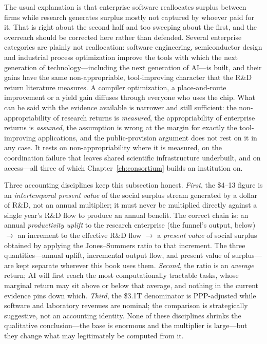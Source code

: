 The usual explanation is that enterprise software reallocates surplus between firms while research generates surplus mostly not captured by whoever paid for it. That is right about the second half and too sweeping about the first, and the overreach should be corrected here rather than defended. Several enterprise categories are plainly not reallocation: software engineering, semiconductor design and industrial process optimization improve the tools with which the next generation of technology---including the next generation of AI---is built, and their gains have the same non-appropriable, tool-improving character that the R\&D return literature measures. A compiler optimization, a place-and-route improvement or a yield gain diffuses through everyone who uses the chip. What can be said with the evidence available is narrower and still sufficient: the non-appropriability of research returns is \emph{measured}, the appropriability of enterprise returns is \emph{assumed}, the assumption is wrong at the margin for exactly the tool-improving applications, and the public-provision argument does not rest on it in any case. It rests on non-appropriability where it is measured, on the coordination failure that leaves shared scientific infrastructure underbuilt, and on access---all three of which Chapter~\ref{ch:consortium} builds an institution on.

Three accounting disciplines keep this subsection honest. \emph{First}, the \$4--13 figure is an \emph{intertemporal present value} of the social surplus stream generated by a dollar of R\&D, not an annual multiplier; it must never be multiplied directly against a single year's R\&D flow to produce an annual benefit. The correct chain is: an annual \emph{productivity uplift} to the research enterprise (the funnel's output, below) $\rightarrow$ an increment to the effective R\&D flow $\rightarrow$ a \emph{present value} of social surplus obtained by applying the Jones--Summers ratio to that increment. The three quantities---annual uplift, incremental output flow, and present value of surplus---are kept separate wherever this book uses them. \emph{Second}, the ratio is an \emph{average} return; AI will first reach the most computationally tractable tasks, whose marginal return may sit above or below that average, and nothing in the current evidence pins down which. \emph{Third}, the \$3.1T denominator is PPP-adjusted while software and laboratory revenues are nominal; the comparison is strategically suggestive, not an accounting identity. None of these disciplines shrinks the qualitative conclusion---the base is enormous and the multiplier is large---but they change what may legitimately be computed from it.

